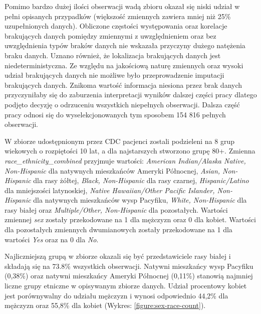 \documentclass[polish, twoside, 12pt, a4paper]{article}
\theoremstyle{definition}
\theoremstyle{plain}
\theoremstyle{remark}
\begin{document}
Pomimo bardzo dużej ilości obserwacji wadą zbioru okazał się niski udział w pełni opisanych przypadków (większość zmiennych zawiera mniej niż 25\% uzupełnionych danych). Obliczone częstości występowania oraz korelacje brakujących danych pomiędzy zmiennymi z uwzględnieniem oraz bez uwzględnienia typów braków danych nie wskazała przyczyny dużego natężenia braku danych. Uznano również, że lokalizacja brakujących danych jest niedeterministyczna. Ze względu na jakościową naturę zmiennych oraz wysoki udział brakujących danych nie możliwe było przeprowadzenie imputacji brakujących danych. Znikoma wartość informacja niesiona przez brak danych przyczyniłaby się do zaburzenia interpretacji wyników dalszej części pracy dlatego podjęto decyzję o odrzuceniu wszystkich niepełnych obserwacji. Dalsza część pracy odnosi się do wyselekcjonowanych tym sposobem 154 816 pełnych obserwacji. 

W zbiorze udostępnionym przez CDC pacjenci zostali podzieleni na 8 grup wiekowych o rozpiętości 10 lat, a dla najstarszych stworzono grupę 80+. Zmienna \emph{race\_ethnicity\_combined} przyjmuje wartości: \emph{American Indian/Alaska Native, Non-Hispanic} dla natywnych mieszkańców Ameryki Północnej, \emph{Asian, Non-Hispanic} dla rasy żółtej, \emph{Black, Non-Hispanic} dla rasy czarnej, \emph{Hispanic/Latino} dla mniejszości latynoskiej, \emph{Native Hawaiian/Other Pacific Islander, Non-Hispanic} dla natywnych mieszkańców wysp Pacyfiku, \emph{White, Non-Hispanic} dla rasy białej oraz \emph{Multiple/Other, Non-Hispanic} dla pozostałych. Wartości zmiennej \emph{sex} zostały przekodowane na 1 dla mężczyzn oraz 0 dla kobiet. Wartości dla pozostałych zmiennych dwumianowych zostały przekodowane na 1 dla wartości \emph{Yes} oraz na 0 dla \emph{No}.

Najliczniejszą grupą w zbiorze okazali się być przedstawiciele rasy białej i składają się na 73.8\% wszystkich obserwacji. Natywni mieszkańcy wysp Pacyfiku (0,38\%) oraz natywni mieszkańcy Ameryki Północnej (0,11\%) stanowią najmniej liczne grupy etniczne w opisywanym zbiorze danych. Udział procentowy kobiet jest porównywalny do udziału mężczyzn i wynosi odpowiednio 44,2\% dla mężczyzn oraz 55,8\% dla kobiet (Wykres: \ref{figure:sex-race-count}).
\end{document}
